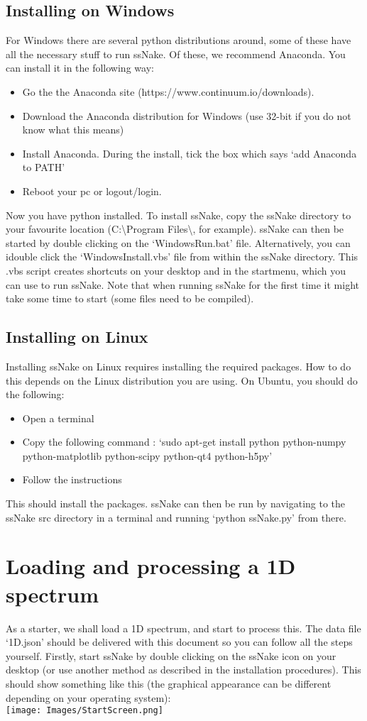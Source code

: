 \documentclass[11pt,a4paper]{article}
\begin{document}
\subsection{Installing on Windows}
For Windows there are several python distributions around, some of these have all the necessary stuff to run ssNake. Of these, we recommend Anaconda. You can install it in the following way:
\begin{itemize}
\item Go the the Anaconda site (https://www.continuum.io/downloads).
\item Download the Anaconda distribution for Windows (use 32-bit if you do not know what this means)
\item Install Anaconda. During the install, tick the box which says `add Anaconda to PATH'
\item Reboot your pc or logout/login.
\end{itemize}
Now you have python installed. To install ssNake, copy the ssNake directory to your favourite
location (C:\textbackslash{}Program Files\textbackslash{}, for example).  ssNake can then be started
by double clicking on the `WindowsRun.bat' file. Alternatively, you can idouble click the
`WindowsInstall.vbs' file from within the ssNake directory. This .vbs script creates shortcuts on
your desktop and in the startmenu, which you can use to run ssNake. Note that when running ssNake
for the first time it might take some time to start (some files need to be compiled).

\subsection{Installing on Linux}
Installing ssNake on Linux requires installing the required packages. How to do this depends on the Linux distribution you are using. On Ubuntu, you should do the following:
\begin{itemize}
\item Open a terminal
\item Copy the following command : `sudo apt-get install python python-numpy python-matplotlib python-scipy python-qt4 python-h5py'
\item Follow the instructions
\end{itemize}
This should install the packages. ssNake can then be run by navigating to the ssNake src directory in a
terminal and running `python ssNake.py' from there.


\section{Loading and processing a 1D spectrum}
As a starter, we shall load a 1D spectrum, and start to process this. The data file `1D.json' should
be delivered with this document so you can follow all the steps yourself. Firstly, start ssNake by
double clicking on the ssNake icon on your desktop (or use another method as described in the
installation procedures). This should show something like this (the graphical appearance can be
different depending on your operating system):\\
\texttt{[image: Images/StartScreen.png]}
\end{document}
